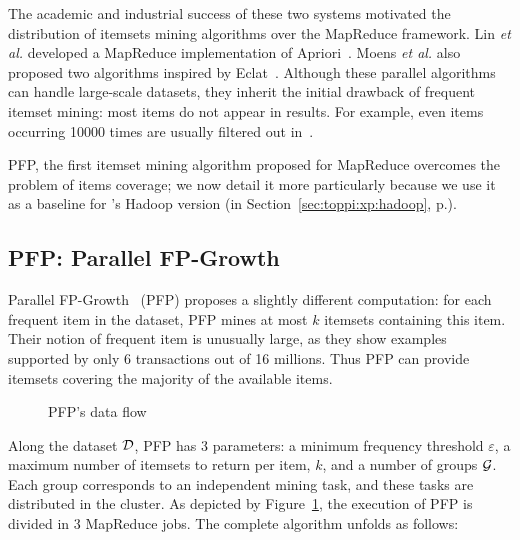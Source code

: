 The academic and industrial success of these two systems
motivated the distribution of itemsets mining algorithms over the MapReduce framework.
Lin {\em et al.} developed a MapReduce implementation of Apriori~\cite{LinICUIMC12}.
Moens {\em et al.} also proposed two algorithms inspired by Eclat~\cite{MoensSML13}.
Although these parallel algorithms can handle large-scale datasets,
they inherit the initial drawback of frequent itemset mining:
most items do not appear in results.
For example, even items occurring \num{10000} times are usually filtered out in~\cite{MoensSML13}.

PFP, the first itemset mining algorithm proposed for MapReduce overcomes the problem of items coverage;
we now detail it more particularly because we use it as a baseline for \toppi's Hadoop version
(in Section~\ref{sec:toppi:xp:hadoop}, p.\pageref{sec:toppi:xp:hadoop}).



\subsection{PFP: Parallel FP-Growth}
\label{sec:rel:pfp}

Parallel FP-Growth~\cite{LiRecSys08} (PFP) proposes a slightly different computation:
for each frequent item in the dataset, PFP mines at most $k$ itemsets containing this item.
Their notion of frequent item is unusually large,
as they show examples supported by only 6 transactions out of 16 millions.
Thus PFP can provide itemsets covering the majority of the available items.

\begin{figure}[tb]
	\centering
	\begin{scriptsize}
	\def\svgwidth{\linewidth}
	
	\end{scriptsize}
	\caption{\label{fig:pfp}PFP's data flow}
\end{figure}

Along the dataset $\cal D$, PFP has 3 parameters:
a minimum frequency threshold $\varepsilon$,
a maximum number of itemsets to return per item, $k$,
and a number of groups $\cal G$.
Each group corresponds to an independent mining task,
and these tasks are distributed in the cluster.
As depicted by Figure~\ref{fig:pfp},
the execution of PFP is divided in 3 MapReduce jobs.
The complete algorithm unfolds as follows:

